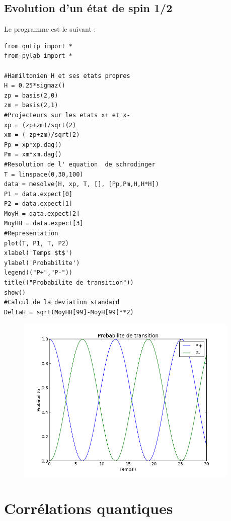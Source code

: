 \documentclass[a4paper,12pt]{book}
\numberwithin{equation}{section}
\begin{document}
\subsection{Evolution d'un état de spin 1/2}
Le programme est le suivant :
\begin{lstlisting}
from qutip import *
from pylab import *

#Hamiltonien H et ses etats propres
H = 0.25*sigmaz()
zp = basis(2,0)
zm = basis(2,1)
#Projecteurs sur les etats x+ et x-
xp = (zp+zm)/sqrt(2)
xm = (-zp+zm)/sqrt(2)
Pp = xp*xp.dag()
Pm = xm*xm.dag()
#Resolution de l' equation  de schrodinger
T = linspace(0,30,100)
data = mesolve(H, xp, T, [], [Pp,Pm,H,H*H])
P1 = data.expect[0]
P2 = data.expect[1]
MoyH = data.expect[2]
MoyHH = data.expect[3]
#Representation
plot(T, P1, T, P2)
xlabel('Temps $t$')
ylabel('Probabilite')
legend(("P+","P-"))
title(("Probabilite de transition"))
show()
#Calcul de la deviation standard
DeltaH = sqrt(MoyHH[99]-MoyH[99]**2)
\end{lstlisting}

\begin{figure}[!h]
\begin{center}
\includegraphics[height=8cm]{graphics/Spin1_2.png}
\end{center}
\end{figure}

\section{Corrélations quantiques}
\end{document}
